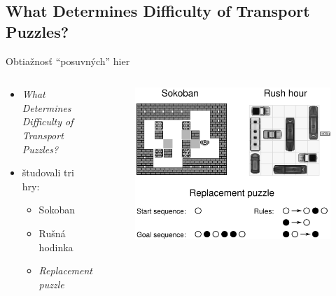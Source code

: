 \documentclass[xcolor={table}]{beamer}
\begin{document}
    	\subsection{{What Determines Difficulty of Transport Puzzles?}}    		
    		\begin{frame}{Obtiažnosť ``posuvných'' hier}
    			\begin{columns}
    				\begin{block}{}
    					\begin{itemize}
    						\item \emph{What Determines Difficulty of Transport Puzzles?} \cite{transport}
    						\item študovali tri hry:
    							\begin{itemize}
    								\item Sokoban
    								\item Rušná hodinka
    								\item \emph{Replacement puzzle}				
								\end{itemize}
    					\end{itemize}
    				\end{block}
    				\begin{figure}[h]
				    	\centering
				    	\includegraphics[width=\textwidth]{images/puzzles}
					\end{figure}
				\end{columns}
    		\end{frame}
\end{document}
